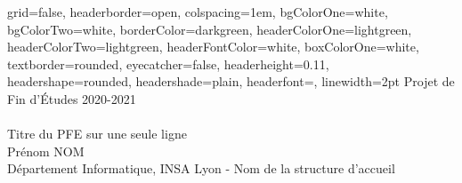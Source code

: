 \documentclass[a0paper,portrait]{baposter}
\begin{document}

\begin{poster}
{
grid=false,
headerborder=open, %
colspacing=1em, %
bgColorOne=white, %
bgColorTwo=white, %
borderColor=darkgreen, %
headerColorOne=lightgreen, %
headerColorTwo=lightgreen, %
headerFontColor=white, %
boxColorOne=white, %
textborder=rounded, %
eyecatcher=false, %
headerheight=0.11\textheight, %
headershape=rounded, %
headershade=plain,
headerfont=\Large\textsf, %
linewidth=2pt %
}
{}
%
%
{
{\small Projet de Fin d'Études 2020-2021}
\sf\vspace{0.3em}\\
\\\textsf %
{
Titre du PFE sur une seule ligne
}
} %
{\sf\vspace{0.5em}\\
Prénom NOM
\vspace{0.1em}\\
\small{Département Informatique, INSA Lyon - Nom de la structure d'accueil
}}
\end{poster}
\end{document}
